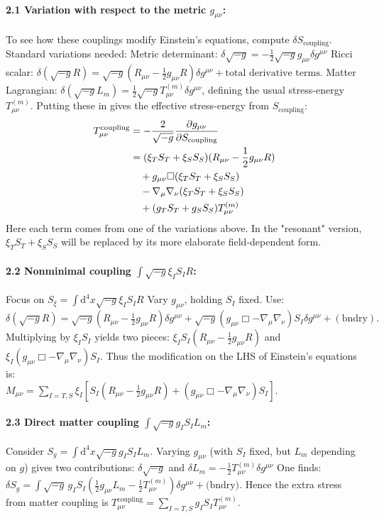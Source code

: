 \documentclass[11pt,a4paper]{article} %
\newcommand{\ST}{S_T}
\newcommand{\SSp}{S_S} %
\newcommand{\Scoupling}{S_{\text{coupling}}}
\newcommand{\Lm}{L_m}
\newcommand{\Tmu}{T} %
\newcommand{\Mmu}{M} %
\newcommand{\Tmncoupling}{T^{\text{coupling}}_{\mu\nu}}
\newcommand{\Tmnm}{T^{(m)}_{\mu\nu}} %
\begin{document}
\paragraph{2.1 Variation with respect to the metric $g_{\mu\nu}$:}
To see how these couplings modify Einstein's equations, compute $\delta\Scoupling$. Standard variations needed:
Metric determinant: $\delta\sqrt{-g}=-\frac{1}{2}\sqrt{-g}g_{\mu\nu}\delta g^{\mu\nu}$
Ricci scalar: $\delta(\sqrt{-g}R)=\sqrt{-g}(R_{\mu\nu}-\frac{1}{2}g_{\mu\nu}R)\delta g^{\mu\nu}+ \text{total derivative terms}.$
Matter Lagrangian: $\delta(\sqrt{-g}\Lm)=\frac{1}{2}\sqrt{-g}\Tmnm\delta g^{\mu\nu}$, defining the usual stress-energy $\Tmnm$.
Putting these in gives the effective stress-energy from $\Scoupling$:
\begin{align*}
\Tmncoupling &= -\frac{2}{\sqrt{-g}}\pdv{g_{\mu\nu}}{\Scoupling}\\
&=(\xi_T\ST+\xi_S\SSp)(R_{\mu\nu}-\frac{1}{2}g_{\mu\nu}R)\\
&\quad +g_{\mu\nu}\Box(\xi_T\ST+\xi_S\SSp)\\
&\quad -\nabla_\mu\nabla_\nu(\xi_T\ST+\xi_S\SSp)\\
&\quad +(g_T\ST+g_S\SSp)\Tmnm
\end{align*}
Here each term comes from one of the variations above. In the "resonant" version, $\xi_T\ST+\xi_S\SSp$ will be replaced by its more elaborate field-dependent form.

\paragraph{2.2 Nonminimal coupling $\int\sqrt{-g}\xi_I S_I R$:}
Focus on $S_\xi=\int\text{d}^4x\sqrt{-g}\xi_I S_I R$
Vary $g_{\mu\nu}$, holding $S_I$ fixed. Use:
$\delta(\sqrt{-g}R)=\sqrt{-g}(R_{\mu\nu}-\frac{1}{2}g_{\mu\nu}R)\delta g^{\mu\nu}+\sqrt{-g}(g_{\mu\nu}\Box-\nabla_\mu\nabla_\nu)S_I\delta g^{\mu\nu}+(\text{bndry}).$
Multiplying by $\xi_I S_I$ yields two pieces:
$\xi_I S_I(R_{\mu\nu}-\frac{1}{2}g_{\mu\nu}R)$
and $\xi_I(g_{\mu\nu}\Box-\nabla_\mu\nabla_\nu)S_I$.
Thus the modification on the LHS of Einstein's equations is: \\
$\Mmu_{\mu\nu}=\sum_{I=T,S}\xi_I\left[S_I(R_{\mu\nu}-\frac{1}{2}g_{\mu\nu}R)+(g_{\mu\nu}\Box-\nabla_\mu\nabla_\nu)S_I\right].$

\paragraph{2.3 Direct matter coupling $\int\sqrt{-g}g_I S_I\Lm$:}
Consider $S_g=\int\text{d}^4x\sqrt{-g}g_I S_I\Lm$.
Varying $g_{\mu\nu}$ (with $S_I$ fixed, but $\Lm$ depending on $g$) gives two contributions:
$\delta\sqrt{-g}$
and $\delta\Lm=-\frac{1}{2}\Tmnm\delta g^{\mu\nu}$
One finds:
$\delta S_g=\int\sqrt{-g}\,g_I S_I\left(\frac{1}{2}g_{\mu\nu}\Lm-\frac{1}{2}\Tmnm\right)\delta g^{\mu\nu} +\text{(bndry)}.$
Hence the extra stress from matter coupling is
$\Tmu^{\text{coupling}}_{\mu\nu}=\sum_{I=T,S}g_I S_I\Tmnm.$
\end{document}
